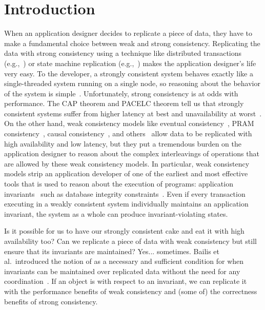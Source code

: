 \section{Introduction}
When an application designer decides to replicate a piece of data, they have to
make a fundamental choice between weak and strong consistency. Replicating the
data with strong consistency using a technique like distributed transactions
(e.g.,~\cite{bernstein1981concurrency,mohan1986transaction}) or state machine
replication (e.g.,~\cite{schneider1990implementing, lamport1998part,
liskov2012viewstamped, ongaro2014search}) makes the application designer's life
very easy. To the developer, a strongly consistent system behaves exactly like
a single-threaded system running on a single node, so reasoning about the
behavior of the system is simple~\cite{herlihy1990linearizability}.
Unfortunately, strong consistency is at odds with performance. The CAP theorem
and PACELC theorem tell us that strongly consistent systems suffer from higher
latency at best and unavailability at worst~\cite{gilbert2002brewer,
brewer2012cap, abadi2012consistency}. On the other hand, weak consistency
models like eventual consistency~\cite{vogels2009eventually}, PRAM
consistency~\cite{lipton1988pram}, causal consistency~\cite{ahamad1995causal},
and others~\cite{lloyd2011don, mehdi2017can} allow data to be replicated with
high availability and low latency, but they put a tremendous burden on the
application designer to reason about the complex interleavings of operations
that are allowed by these weak consistency models. In particular, weak
consistency models strip an application developer of one of the earliest and
most effective tools that is used to reason about the execution of programs:
application invariants~\cite{hoare1969axiomatic, balegas2015towards} such as
database integrity constraints~\cite{grefen1993integrity, gupta1993local}. Even
if every transaction executing in a weakly consistent system individually
maintains an application invariant, the system as a whole can produce
invariant-violating states.

Is it possible for us to have our strongly consistent cake and eat it with high
availability too? Can we replicate a piece of data with weak consistency but
still ensure that its invariants are maintained? Yes... sometimes. Bailis et
al.\ introduced the notion of \emph{\invariantconfluence{}} as a necessary and
sufficient condition for when invariants can be maintained over replicated data
without the need for any coordination~\cite{bailis2014coordination}. If an
object is \invariantconfluent{} with respect to an invariant, we can replicate
it with the performance benefits of weak consistency and (some of) the
correctness benefits of strong consistency.

